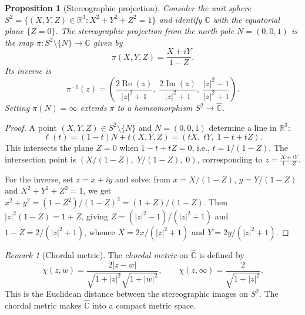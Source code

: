 \documentclass[12pt,a4paper,openany]{book}
\theoremstyle{definition}
\theoremstyle{plain}
\newtheorem{proposition}[definition]{Proposition}
\theoremstyle{remark}
\newtheorem{remark}[definition]{Remark}
\newcommand{\C}{\mathbb{C}}
\newcommand{\R}{\mathbb{R}}
\DeclareMathOperator{\re}{Re}
\DeclareMathOperator{\im}{Im}
\newcommand{\abs}[1]{\left|#1\right|}
\begin{document}
\begin{proposition}[Stereographic projection]
\label{prop:stereographic}
Consider the unit sphere $S^2 = \{(X,Y,Z)\in\R^3 : X^2+Y^2+Z^2=1\}$ and identify $\C$ with the equatorial plane $\{Z=0\}$. The stereographic projection from the north pole $N=(0,0,1)$ is the map $\pi:S^2\setminus\{N\}\to\C$ given by
\[
  \pi(X,Y,Z) = \frac{X+iY}{1-Z}.
\]
Its inverse is
\[
  \pi^{-1}(z) = \left(\frac{2\re(z)}{\abs{z}^2+1},\; \frac{2\im(z)}{\abs{z}^2+1},\; \frac{\abs{z}^2-1}{\abs{z}^2+1}\right).
\]
Setting $\pi(N) = \infty$ extends $\pi$ to a homeomorphism $S^2\to\hat{\C}$.
\end{proposition}

\begin{proof}
A point $(X,Y,Z)\in S^2\setminus\{N\}$ and $N=(0,0,1)$ determine a line in $\R^3$:
\[
  \ell(t) = (1-t)N + t(X,Y,Z) = (tX,\; tY,\; 1-t+tZ).
\]
This intersects the plane $Z=0$ when $1-t+tZ=0$, i.e., $t=1/(1-Z)$. The intersection point is $(X/(1-Z),\; Y/(1-Z),\; 0)$, corresponding to $z=\frac{X+iY}{1-Z}$.

For the inverse, set $z=x+iy$ and solve: from $x=X/(1-Z)$, $y=Y/(1-Z)$ and $X^2+Y^2+Z^2=1$, we get $x^2+y^2 = (1-Z^2)/(1-Z)^2 = (1+Z)/(1-Z)$. Then $\abs{z}^2(1-Z) = 1+Z$, giving $Z = (\abs{z}^2-1)/(\abs{z}^2+1)$ and $1-Z = 2/(\abs{z}^2+1)$, whence $X = 2x/(\abs{z}^2+1)$ and $Y = 2y/(\abs{z}^2+1)$.
\end{proof}

\begin{center}
\end{center}

\begin{remark}[Chordal metric]
\label{rem:chordal}
The \emph{chordal metric} on $\hat{\C}$ is defined by
\[
  \chi(z,w) = \frac{2\abs{z-w}}{\sqrt{1+\abs{z}^2}\sqrt{1+\abs{w}^2}}, \qquad \chi(z,\infty) = \frac{2}{\sqrt{1+\abs{z}^2}}.
\]
This is the Euclidean distance between the stereographic images on $S^2$. The chordal metric makes $\hat{\C}$ into a compact metric space.
\end{remark}
\end{document}
